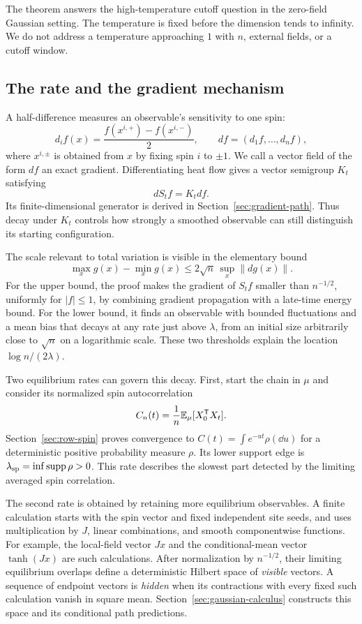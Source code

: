 The theorem answers the high-temperature cutoff question in the
zero-field Gaussian setting.  The temperature is fixed before the
dimension tends to infinity.  We do not address a temperature
approaching \(1\) with \(n\), external fields, or a cutoff window.

\subsection{The rate and the gradient mechanism}

A half-difference measures an observable's sensitivity to one spin:
\[
 d_i f(x)=\frac{f(x^{i,+})-f(x^{i,-})}{2},
 \qquad df=(d_1f,\ldots,d_nf),
\]
where \(x^{i,\pm}\) is obtained from \(x\) by fixing spin \(i\) to
\(\pm1\). We call a vector field of the form \(df\) an exact gradient.
Differentiating heat flow gives a vector semigroup \(K_t\) satisfying
\[
 dS_tf=K_tdf.
\]
Its finite-dimensional generator is derived in
Section~\ref{sec:gradient-path}. Thus decay under \(K_t\) controls
how strongly a smoothed observable can still distinguish its starting
configuration.

The scale relevant to total variation is visible in the elementary bound
\[
 \max_x g(x)-\min_x g(x)
 \le 2\sqrt n\,\sup_x\|dg(x)\|.
\]
For the upper bound, the proof makes the gradient of \(S_tf\) smaller
than \(n^{-1/2}\), uniformly for \(|f|\le1\), by combining gradient
propagation with a late-time energy bound. For the lower bound, it finds
an observable with bounded fluctuations and a mean bias that decays at
any rate just above \(\lambda\), from an initial size arbitrarily close
to \(\sqrt n\) on a logarithmic scale. These two thresholds explain
the location \(\log n/(2\lambda)\).

Two equilibrium rates can govern this decay. First, start the chain in
\(\mu\) and consider its normalized spin autocorrelation
\[
 C_n(t)=\frac1n\mathbb E_\mu[X_0^{\mathsf T}X_t].
\]
Section~\ref{sec:row-spin} proves convergence to
\(C(t)=\int e^{-ut}\rho(\dd u)\) for a deterministic positive
probability measure \(\rho\). Its lower support edge is
\(\lambda_{\rm sp}=\inf\operatorname{supp}\rho>0\).
This rate describes the slowest part detected by the limiting averaged
spin correlation.

The second rate is obtained by retaining more equilibrium observables.
A finite calculation starts with the spin vector and fixed independent
site seeds, and uses multiplication by \(J\), linear combinations,
and smooth componentwise functions. For example, the local-field vector
\(Jx\) and the conditional-mean vector \(\tanh(Jx)\) are such
calculations. After normalization by \(n^{-1/2}\), their limiting
equilibrium overlaps define a deterministic Hilbert space of
\emph{visible} vectors. A sequence of endpoint vectors is \emph{hidden}
when its contractions with every fixed such calculation vanish in
square mean.
Section~\ref{sec:gaussian-calculus} constructs this space and its
conditional path predictions.

